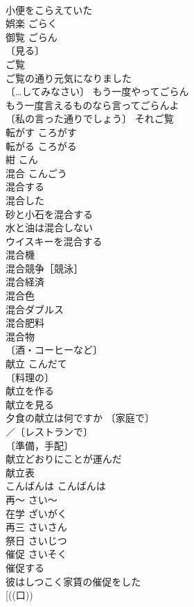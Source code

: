 \documentclass[8pt]{extreport}
\begin{document}
\begin{CJK}{UTF8}{min}
\\	小便をこらえていた 
\\	娯楽	ごらく	
\\	御覧	ごらん	
\\	〔見る〕
\\	ご覧 
\\	ご覧の通り元気になりました 
\\	〔…してみなさい〕 もう一度やってごらん 
\\	もう一度言えるものなら言ってごらんよ 
\\	〔私の言った通りでしょう〕 それご覧 
\\	転がす	ころがす	
\\	転がる	ころがる	
\\	紺	こん	
\\	混合	こんごう	
\\	混合する 
\\	混合した 
\\	砂と小石を混合する 
\\	水と油は混合しない 
\\	ウイスキーを混合する 
\\	混合機 
\\	混合競争［競泳］ 
\\	混合経済 
\\	混合色 
\\	混合ダブルス 
\\	混合肥料 
\\	混合物 
\\	〔酒・コーヒーなど〕
\\	献立	こんだて	
\\	〔料理の〕
\\	献立を作る 
\\	献立を見る 
\\	夕食の献立は何ですか 〔家庭で〕
\\	／〔レストランで〕
\\	〔準備，手配〕
\\	献立どおりにことが運んだ 
\\	献立表 
\\	こんばんは	こんばんは	
\\	再～	さい～	
\\	在学	ざいがく	
\\	再三	さいさん	
\\	祭日	さいじつ	
\\	催促	さいそく	
\\	催促する 
\\	彼はしつこく家賃の催促をした 
\\	[((口))

\end{CJK}
\end{document}
